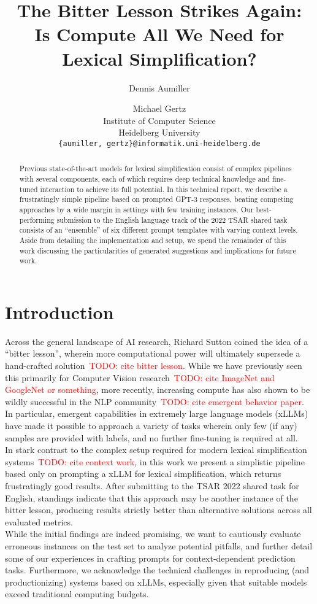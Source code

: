 \documentclass[11pt]{article}
\title{The Bitter Lesson Strikes Again:\\ Is Compute All We Need for Lexical Simplification?}
\author{Dennis Aumiller \and Michael Gertz \\
  Institute of Computer Science \\
  Heidelberg University \\
  \texttt{\{aumiller, gertz\}@informatik.uni-heidelberg.de}}
\newcommand{\todo}[1]{\textcolor{red}{TODO: #1}}
\begin{document}
\maketitle
\begin{abstract}
Previous state-of-the-art models for lexical simplification consist of complex pipelines with several components, each of which requires deep technical knowledge and fine-tuned interaction to achieve its full potential.
In this technical report, we describe a frustratingly simple pipeline based on prompted GPT-3 responses, beating competing approaches by a wide margin in settings with few training instances.
Our best-performing submission to the English language track of the 2022 TSAR shared task consists of an ``ensemble'' of six different prompt templates with varying context levels.
Aside from detailing the implementation and setup, we spend the remainder of this work discussing the particularities of generated suggestions and implications for future work.
\end{abstract}

\section{Introduction}
Across the general landscape of AI research, Richard Sutton coined the idea of a ``bitter lesson'', wherein more computational power will ultimately supersede a hand-crafted solution~\todo{cite bitter lesson}.
While we have previously seen this primarily for Computer Vision research~\todo{cite ImageNet and GoogleNet or something}, more recently, increasing compute has also shown to be wildly successful in the NLP community~\todo{cite emergent behavior paper}.
In particular, emergent capabilities in extremely large language models (xLLMs) have made it possible to approach a variety of tasks wherein only few (if any) samples are provided with labels, and no further fine-tuning is required at all.\\
In stark contrast to the complex setup required for modern lexical simplification systems~\todo{cite context work}, in this work we present a simplistic pipeline based only on prompting a xLLM for lexical simplification, which returns frustratingly good results.
After submitting to the TSAR 2022 shared task for English, standings indicate that this approach may be another instance of the bitter lesson, producing results strictly better than alternative solutions across all evaluated metrics.\\
While the initial findings are indeed promising, we want to cautiously evaluate erroneous instances on the test set to analyze potential pitfalls, and further detail some of our experiences in crafting prompts for context-dependent prediction tasks.
Furthermore, we acknowledge the technical challenges in reproducing (and productionizing) systems based on xLLMs, especially given that suitable models exceed traditional computing budgets.
\end{document}
